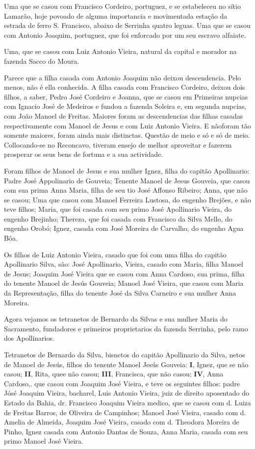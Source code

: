 Uma que se casou com Francisco Cordeiro, portuguez, e se estabeleceu no sítio Lamarão, hoje povoado de alguma importancia e movimentada estação da estrada de ferro S. Francisco, abaixo de Serrinha quatro leguas. Uma que se casou com Antonio Joaquim, portuguez, que foi enforcado por um seu escravo alfaiate.

Uma, que se casou com Luiz Antonio Vieira, natural da capital e morador na fazenda Sacco do Moura.

Parece que a  filha casada com Antonio Joaquim não deixou descendencia. Pelo menos, não é ella conhecida. A filha casada com Francisco Cordeiro, deixou dois filhos, a saber, Pedro José Cordeiro e Joanna, que se casou em Primeiras nupcias  com Ignacio José de Medeiros e fundou a fazenda Soleira e, em  segunda nupcias, com João Manoel de Freitas. Maiores foram as descendencias das filhas casadas respectivamente com Manoel de Jesus e com Luiz Antonio Vieira. E  nãoforam  tão somente maiores, foram ainda mais distinctas. Questão de meio e só e só de meio. Collocando-se no Reconcavo, tiveram ensejo de  melhor aproveitar e fazerem prosperar os seus bens de fortuna e a sua actividade.

Foram filhos de Manoel de Jesus e sua mulher Ignez, filha do capitão Apollinario:  Padre José Appolinario de Gouveia; Tenente Manoel de Jesus Gouveia, que casou com sua prima Anna Maria, filha  de seu tio José Affonso Ribeiro; Anna, que não se casou; Uma que casou com Manoel Ferreira Lustosa, do engenho Brejões, e não  teve filhos; Maria, que foi  casada com seu primo José Apollinario Vieira, do engenho Brejinho; Thereza, que foi casada com Francisco da Silva Mello, do engenho Orobó; Ignez, casada com José Moreira de Carvalho, do engenho Agua Bôa.

Os filhos de Luiz Antonio Vieira, casado que foi com uma filha do capitão Apollinario Silva, são: José Apollinario, Vieira, casado com Maria, filha Manoel de Jesus; Joaquim José Vieira que se casou com Anna Cardoso, sua prima, filha do tenente Manoel de Jesús Gouveia; Manoel José Vieira, que casou com Maria da Representação, filha do tenente José da Silva Carneiro e sua mulher Anna Moreira.


Agora vejamos os tetranetos de Bernardo da Silvas e sua mulher Maria do Sacramento, fundadores e primeiros proprietarios da fazenda Serrinha, pelo ramo dos Apollinarios.

Tetranetos de Bernardo da Silva, bisnetos do capitão Apollinario da Silva, netos de Manoel de Jesús, filhos do tenente Manoel Jesús Gouveia: \textbf{I}, Ignez, que se não casou; \textbf{II}, Rita,
quee não casou; \textbf{III}, Francisca, que não casou; \textbf{IV}, Anna Cardoso,. que casou com Joaquim José Vieira, e teve os seguintes filhos: padre Jósé Joaquim Vieira, bacharel, Luis Antonio Vieira, juiz de direito aposentado do Estado da Bahia, dr. Francisco Joaquim Vieira medico, que se casou com d. Luiza de Freitas Barros, de Oliveira de Campinhos; Manoel José Vieira, casado com d. Amelia de Almeida, Joaquim José Vieira, casado com d. Theodora Moreira de Pinho, Ignez casada com Antonio Dantas de Souza, Anna Maria, casada com seu primo Manoel José Vieira.

